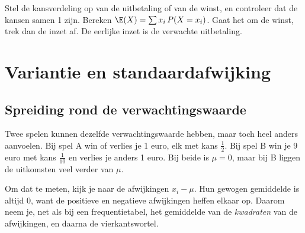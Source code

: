 \begin{werkwijze}
Stel de kansverdeling op van de uitbetaling of van de winst, en controleer dat de kansen samen 1 zijn. Bereken $\E(X) = \sum x_i \, P(X = x_i)$. Gaat het om de winst, trek dan de inzet af. De eerlijke inzet is de verwachte uitbetaling.
\end{werkwijze}

\begin{oefeningen}
\end{oefeningen}

\section{Variantie en standaardafwijking}

\subsection{Spreiding rond de verwachtingswaarde}

Twee spelen kunnen dezelfde verwachtingswaarde hebben, maar toch heel anders aanvoelen. Bij spel A win of verlies je 1 euro, elk met kans $\frac12$. Bij spel B win je 9 euro met kans $\frac{1}{10}$ en verlies je anders 1 euro. Bij beide is $\mu = 0$, maar bij B liggen de uitkomsten veel verder van $\mu$.


Om dat te meten, kijk je naar de afwijkingen $x_i - \mu$. Hun gewogen gemiddelde is altijd 0, want de positieve en negatieve afwijkingen heffen elkaar op. Daarom neem je, net als bij een frequentietabel, het gemiddelde van de \textit{kwadraten} van de afwijkingen, en daarna de vierkantswortel.

